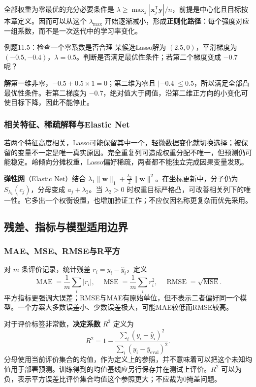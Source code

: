\documentclass[UTF8,fontset=none,zihao=-4,a4paper]{ctexart}
\newcommand{\term}[1]{\textbf{#1}}
\newcommand{\sol}{\par\noindent\textbf{解}\quad}
\numberwithin{equation}{section}
\numberwithin{figure}{section}
\begin{document}
全部权重为零最优的充分必要条件是 $\lambda\geq\max_j|\symbf x_j^{\mathsf T}\symbf y|/n$，前提是中心化且目标按本章定义。因而可以从这个 $\lambda_{\max}$ 开始逐渐减小，形成\term{正则化路径}：每个强度对应一组系数，而不是一次迭代中的学习率变化。

\begin{infobox}{例题11.5：检查一个零系数是否合理}
某候选Lasso解为 $(2.5,0)$，平滑梯度为 $(-0.5,-0.4)$，$\lambda=0.5$。判断是否满足最优性条件；若第二个梯度变成 $-0.7$ 呢？
\end{infobox}
\sol 第一维非零，$-0.5+0.5\times1=0$；第二维为零且 $|-0.4|\leq0.5$，所以满足全部凸最优性条件。若第二梯度为 $-0.7$，绝对值大于阈值，沿第二维正方向的小变化可使目标下降，因此不能停止。

\subsubsection{相关特征、稀疏解释与Elastic Net}
若两个特征高度相关，Lasso可能保留其中一个，轻微数据变化就切换选择；被保留的变量不一定是唯一真实原因。完全重复列可造成权重分配不唯一，但预测仍可能稳定。岭倾向分摊权重，Lasso偏好稀疏，两者都不能独立完成因果变量发现。

\term{弹性网}（Elastic Net）结合 $\lambda_1\|\symbf w\|_1+\frac{\lambda_2}2\|\symbf w\|^2$。在坐标更新中，分子仍为 $S_{\lambda_1}(c_j)$，分母变成 $a_j+\lambda_2$。当 $\lambda_2>0$ 时权重目标严格凸，可改善相关列下的唯一性。它多出一个权衡设置，也增加验证工作；不应仅因名称更复杂而优先采用。

\subsection{残差、指标与模型适用边界}
\subsubsection{MAE、MSE、RMSE与R平方}
对 $m$ 条评价记录，统计残差 $r_i=y_i-\widehat y_i$，定义
\[
 \operatorname{MAE}=\frac1m\sum_i|r_i|,\quad
 \operatorname{MSE}=\frac1m\sum_i r_i^2,\quad
 \operatorname{RMSE}=\sqrt{\operatorname{MSE}}.
\]
平方指标更强调大误差；RMSE与MAE有原始单位，但不表示二者偏好同一个模型。一个方案大多数误差小、少数误差极大，可能MAE较低而RMSE较高。

对于评价标签非常数，\term{决定系数} $R^2$ 定义为
\begin{equation}
 R^2=1-\frac{\sum_i(y_i-\widehat y_i)^2}{\sum_i(y_i-\bar y_{\mathrm{eval}})^2}.
\end{equation}
分母使用当前评价集合的均值，作为定义上的参照，并不意味着可以把这个未知均值用于部署预测。训练得到的均值基线应另行保存并在测试上评价。$R^2$ 可以为负，表示平方误差比评价集合均值这个参照更大；不应裁为0掩盖问题。
\end{document}
